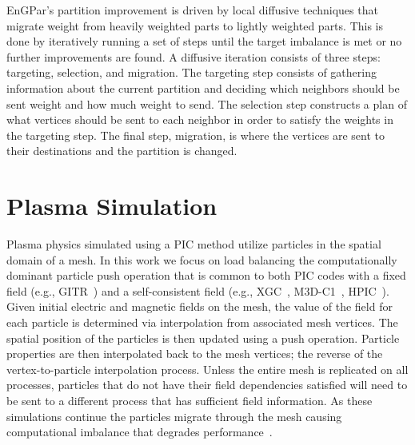 \documentclass[conference]{IEEEtran}
\begin{document}
EnGPar's partition improvement is driven by local diffusive techniques that migrate weight
from heavily weighted parts to lightly weighted parts. This is done by iteratively running
a set of steps until the target imbalance is met or no further improvements are found.
A diffusive iteration consists of three steps: targeting, selection, and migration.
The targeting step consists of gathering information about the current partition and deciding
which neighbors should be sent weight and how much weight to send. The selection step constructs
a plan of what vertices should be sent to each neighbor in order to satisfy the weights in
the targeting step. The final step, migration, is where the vertices are sent to their
destinations and the partition is changed.

\section{Plasma Simulation} \label{sec:pic}

Plasma physics simulated using a PIC method utilize particles
in the spatial domain of a mesh.
In this work we focus on load balancing the computationally dominant particle
push operation that is common to both PIC codes with a fixed field (e.g., GITR~\cite{younkin2017})
and a self-consistent field (e.g., XGC~\cite{chang2004numerical,Ku2016467,ku2009},
M3D-C1~\cite{jardin2012multiple}, HPIC~\cite{hpic2017}).
Given initial electric and magnetic fields on the mesh, the value of the field
for each particle is determined via interpolation from associated mesh vertices.
The spatial position of the particles is then updated using a push operation.
Particle properties are then interpolated back to the mesh vertices; the reverse
of the vertex-to-particle interpolation process.
Unless the entire mesh is replicated on all processes, particles that do not
have their field dependencies satisfied will need to be
sent to a different process that has sufficient field information.
As these simulations continue the particles migrate through the mesh causing
computational imbalance that degrades
performance~\cite{carmona1997,plimptonPic2003,worleyBalancePic2016}.
\end{document}
